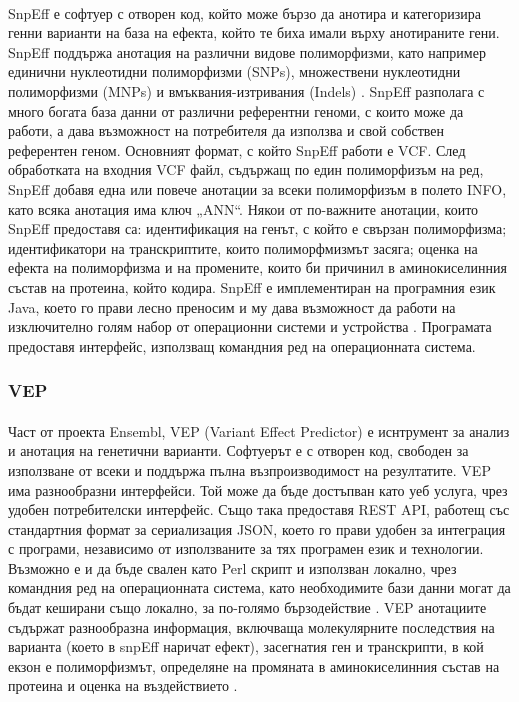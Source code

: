 \documentclass[pdftex,cyrillic,14pt,a4page,twoside,openright]{extreport}
\begin{document}
\paragraph{}
SnpEff е софтуер с отворен код, който може бързо да анотира и категоризира генни варианти на база на ефекта, който те биха имали върху анотираните гени. SnpEff поддържа анотация на различни видове полиморфизми, като например единични нуклеотидни полиморфизми (SNPs), множествени нуклеотидни полиморфизми (MNPs) и вмъквания-изтривания (Indels) \cite{cingolani2012}. SnpEff разполага с много богата база данни от различни референтни геноми, с които може да работи, а дава възможност на потребителя да използва и свой собствен референтен геном. Основният формат, с който SnpEff работи е VCF. След обработката на входния VCF файл, съдържащ по един полиморфизъм на ред, SnpEff добавя една или повече анотации за всеки полиморфизъм в полето INFO, като всяка анотация има ключ „ANN“. Някои от по-важните анотации, които SnpEff предоставя са: идентификация на генът, с който е свързан полиморфизма; идентификатори на транскриптите, които полиморфмизмът засяга; оценка на ефекта на полиморфизма и на промените, които би причинил в аминокиселинния състав на протеина, който кодира. SnpEff е имплементиран на програмния език Java, което го прави лесно преносим и му дава възможност да работи на изключително голям набор от операционни системи и устройства \cite[стр. 9-10]{schildt2020complete}. Програмата предоставя интерфейс, използващ командния ред на операционната система.

\subsubsection{VEP}
\paragraph{}
Част от проекта Ensembl, VEP (Variant Effect Predictor) е иснтрумент за анализ и анотация на генетични варианти. Софтуерът е с отворен код, свободен за използване от всеки и поддържа пълна възпроизводимост на резултатите. VEP има разнообразни интерфейси. Той може да бъде достъпван като уеб услуга, чрез удобен потребителски интерфейс. Също така предоставя REST API, работещ със стандартния формат за сериализация JSON, което го прави удобен за интеграция с програми, независимо от използваните за тях програмен език и технологии. Възможно е и да бъде свален като Perl скрипт и използван локално, чрез командния ред на операционната система, като необходимите бази данни могат да бъдат кеширани също локално, за по-голямо бързодействие \cite{mclaren2016}. VEP анотациите съдържат разнообразна информация, включваща молекулярните последствия на варианта (което в snpEff наричат ефект), засегнатия ген и транскрипти, в кой екзон е полиморфизмът, определяне на промяната в аминокиселинния състав на протеина и оценка на въздействието \cite{hunt2022}.
\end{document}
